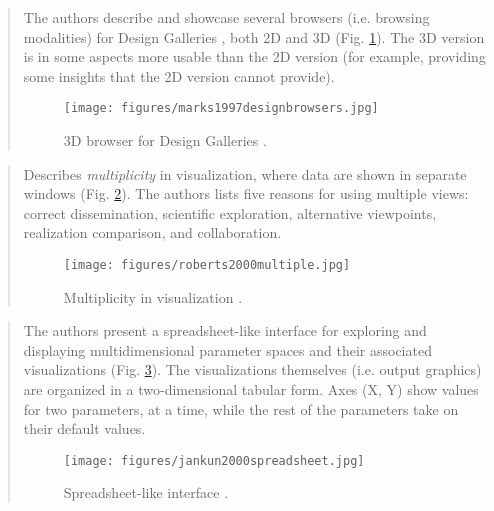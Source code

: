 		\begin{quote}
		\small
		The authors describe and showcase several browsers (i.e. browsing modalities) 
		for Design Galleries \cite{marks1997design},
		both 2D and 3D (Fig. \ref{fig:marks1997designbrowsers}). The 3D version
		is in some aspects more usable than the 2D version (for example, providing some
		insights that the 2D version cannot provide).
		\begin{figure}[htb]
		\begin{center}
		\texttt{[image: figures/marks1997designbrowsers.jpg]}
		\caption{3D browser for Design Galleries \cite{marks1997designbrowsers}.}
		\label{fig:marks1997designbrowsers}
		\end{center}
		\end{figure}				
		\end{quote}

		\begin{quote}
		\small
		Describes {\em multiplicity} in visualization, 
		where data are shown in separate windows (Fig. \ref{fig:roberts2000multiple}).
		The authors lists five reasons for using multiple views: 
		correct dissemination,
		scientific exploration,
		alternative viewpoints,
		realization comparison, and
		collaboration.
		\begin{figure}[htb]
		\begin{center}
		\texttt{[image: figures/roberts2000multiple.jpg]}
		\caption{Multiplicity in visualization \cite{roberts2000multiple}.}
		\label{fig:roberts2000multiple}
		\end{center}
		\end{figure}
		\end{quote}
		
		\begin{quote}
		\small
		The authors present a spreadsheet-like interface for exploring and displaying multidimensional 
		parameter spaces and their associated visualizations (Fig. \ref{fig:jankun2000spreadsheet}). 
		The visualizations themselves (i.e. output graphics) are organized in a two-dimensional tabular form.
		Axes (X, Y) show values for two parameters, at a time, while the rest of the parameters take on
		their default values.
		\begin{figure}[htb]
		\begin{center}
		\texttt{[image: figures/jankun2000spreadsheet.jpg]}
		\caption{Spreadsheet-like interface \cite{jankun2000spreadsheet}.}
		\label{fig:jankun2000spreadsheet}
		\end{center}
		\end{figure}
		\end{quote}

